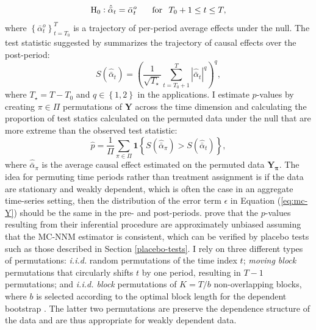 \documentclass[12pt]{article}
\begin{document}
\begin{equation}
\text{H}_0: \hat{\bar{\alpha}}_{t} = \bar{\alpha}^{o}_{t} \, \hspace{5mm} \,  \text{for} \, \hspace{2mm} T_0+1 \leq t \leq T,
\end{equation}
%
where $\left\{\bar{\alpha}^{o}_{t}\right\}_{t=T_0}^T$ is a trajectory of per-period average effects under the null. The test statistic suggested by \citet{chernozhukov2017exact} summarizes the trajectory of causal effects over the post-period:
%
\begin{equation} \label{tstat}
S (\hat{\bar{\alpha}}_{t}) = \left(\frac{1}{\sqrt{T_\star}} \sum_{t=T_0 +1}^{T} |\hat{\bar{\alpha}}_{t}|^q\right)^q,
\end{equation}
%
where $T_\star = T-T_0$ and $q \in \left\{1, 2\right\}$ in the applications. I estimate $p$-values by creating $\pi \in \Pi$ permutations of $\mathbf{Y}$ across the time dimension and calculating the proportion of test statics calculated on the permuted data under the null that are more extreme than the observed test statistic:
%
\begin{equation}
\hat{p} = \frac{1}{\Pi} \sum_{\pi \in \Pi} \textbf{1} \left\{S (\hat{\bar{\alpha}}_{\pi}) > S (\hat{\bar{\alpha}}_{t}) \right\}, \label{pvalue}
\end{equation}
%
where $\hat{\bar{\alpha}}_{\pi}$ is the average causal effect estimated on the permuted data $\mathbf{Y_\pi}$. The idea for permuting time periods rather than treatment assignment is if the data are stationary and weakly dependent, which is often the case in an aggregate time-series setting, then the distribution of the error term $\epsilon$ in Equation (\ref{eq:mc-Y}) should be the same in the pre- and post-periods. \citet{chernozhukov2017exact} prove that the $p$-values resulting from their inferential procedure are approximately unbiased assuming that the MC-NNM estimator is consistent, which can be verified by placebo tests such as those described in Section \ref{placebo-tests}. I rely on three different types of permutations: \emph{i.i.d.} random permutations of the time index $t$; \emph{moving block} permutations that circularly shifts $t$ by one period, resulting in $T-1$ permutations; and \emph{i.i.d. block} permutations of $K=T/b$ non-overlapping blocks, where $b$ is selected according to the optimal block length for the dependent bootstrap \citep{politis2004automatic}. The latter two permutations are preserve the dependence structure of the data and are thus appropriate for weakly dependent data. 
%
\end{document}
